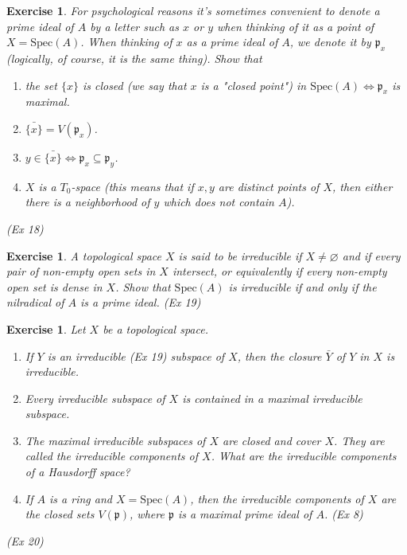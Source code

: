 \documentclass[]{report}
\newtheorem{exercise}[theorem]{Exercise}
\begin{document}
\begin{exercise}
    For psychological reasons it's sometimes convenient to denote a prime ideal of $A$ by a letter such as $x$ or $y$ when thinking of it as a point of $X = \text{Spec}(A)$. When thinking of $x$ as a prime ideal of $A$, we denote it by $\mathfrak{p}_x$ (logically, of course, it is the same thing). Show that
    \begin{enumerate}
    \item the set $\{x\}$ is closed (we say that $x$ is a "closed point") in $\text{Spec}(A) \Leftrightarrow \mathfrak{p}_x$ is maximal.
    \item  $\bar{\{x\}} = V(\mathfrak{p}_x)$.
    \item $y\in \bar{\{x\}} \Leftrightarrow \mathfrak{p}_x \subseteq \mathfrak{p}_y$. 
    \item $X$ is a $T_0$-space (this means that if $x, y$ are distinct points of $X$, then either there is a neighborhood of $y$ which does not contain $A$).
    \end{enumerate}
    (Ex 18)
\end{exercise}

\begin{exercise}
    A topological space $X$ is said to be irreducible if $X \neq \varnothing$ and if every pair of non-empty open sets in $X$ intersect, or equivalently if every non-empty open set is dense in $X$. Show that $\text{Spec}(A)$ is irreducible if and only if the nilradical of $A$ is a prime ideal. 
    (Ex 19)
\end{exercise}

\begin{exercise}
    Let $X$ be a topological space.
    \begin{enumerate}
        \item If $Y$ is an irreducible (Ex 19) subspace of $X$, then the closure $\bar{Y}$ of $Y$ in $X$ is irreducible.
        \item Every irreducible subspace of $X$ is contained in a maximal irreducible subspace. 
        \item The maximal irreducible subspaces of $X$ are closed and cover $X$. They are called the irreducible components of $X$. What are the irreducible components of a Hausdorff space?
        \item If $A$ is a ring and $X = \text{Spec}(A)$, then the irreducible components of $X$ are the closed sets $V(\mathfrak{p})$, where $\mathfrak{p}$ is a maximal prime ideal of $A$. (Ex 8)
    \end{enumerate}
    (Ex 20)
\end{exercise}
\end{document}
